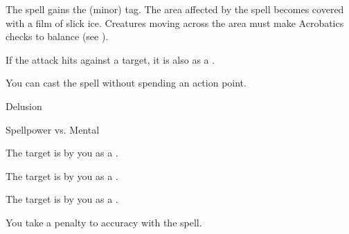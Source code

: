 
The spell gains the  (minor) tag.
The area affected by the spell becomes covered with a film of slick ice.
Creatures moving across the area must make Acrobatics checks to balance (see ).







If the attack hits against a target, it is also  as a .






You can cast the spell without spending an action point.




\newpage
\begin{spellsection}{Delusion}

\begin{spellheader}
\end{spellheader}

\begin{spellcontent}

\begin{spelltargetinginfo}




\end{spelltargetinginfo}


\begin{spelleffects}




\begin{spellattack}{Spellpower vs. Mental}


\spellsuccess The target is \frightened by you as a .


\spellcritical The target is \panicked by you as a .


\spellfailure The target is \shaken by you as a .


\end{spellattack}





\end{spelleffects}

\end{spellcontent}
\begin{spellfooter}


\end{spellfooter}
\begin{spellsubcontent}


\begin{spellcantrip}

You take a  penalty to accuracy with the spell.

\end{spellcantrip}


\end{spellsubcontent}
\end{spellsection}



